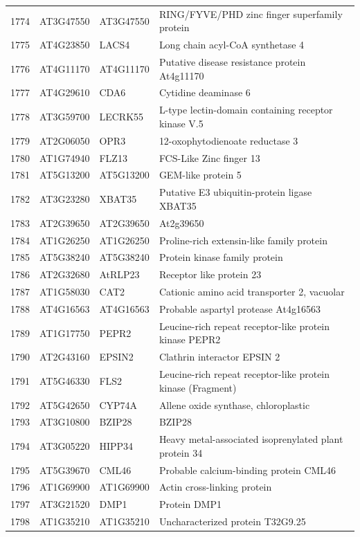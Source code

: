 \documentclass[11pt]{article}
\begin{document}
\begin{center}
\begin{tabular}{rlll}
1774 & AT3G47550 & AT3G47550 & RING/FYVE/PHD zinc finger superfamily protein\\
1775 & AT4G23850 & LACS4 & Long chain acyl-CoA synthetase 4\\
1776 & AT4G11170 & AT4G11170 & Putative disease resistance protein At4g11170\\
1777 & AT4G29610 & CDA6 & Cytidine deaminase 6\\
1778 & AT3G59700 & LECRK55 & L-type lectin-domain containing receptor kinase V.5\\
1779 & AT2G06050 & OPR3 & 12-oxophytodienoate reductase 3\\
1780 & AT1G74940 & FLZ13 & FCS-Like Zinc finger 13\\
1781 & AT5G13200 & AT5G13200 & GEM-like protein 5\\
1782 & AT3G23280 & XBAT35 & Putative E3 ubiquitin-protein ligase XBAT35\\
1783 & AT2G39650 & AT2G39650 & At2g39650\\
1784 & AT1G26250 & AT1G26250 & Proline-rich extensin-like family protein\\
1785 & AT5G38240 & AT5G38240 & Protein kinase family protein\\
1786 & AT2G32680 & AtRLP23 & Receptor like protein 23\\
1787 & AT1G58030 & CAT2 & Cationic amino acid transporter 2, vacuolar\\
1788 & AT4G16563 & AT4G16563 & Probable aspartyl protease At4g16563\\
1789 & AT1G17750 & PEPR2 & Leucine-rich repeat receptor-like protein kinase PEPR2\\
1790 & AT2G43160 & EPSIN2 & Clathrin interactor EPSIN 2\\
1791 & AT5G46330 & FLS2 & Leucine-rich repeat receptor-like protein kinase (Fragment)\\
1792 & AT5G42650 & CYP74A & Allene oxide synthase, chloroplastic\\
1793 & AT3G10800 & BZIP28 & BZIP28\\
1794 & AT3G05220 & HIPP34 & Heavy metal-associated isoprenylated plant protein 34\\
1795 & AT5G39670 & CML46 & Probable calcium-binding protein CML46\\
1796 & AT1G69900 & AT1G69900 & Actin cross-linking protein\\
1797 & AT3G21520 & DMP1 & Protein DMP1\\
1798 & AT1G35210 & AT1G35210 & Uncharacterized protein T32G9.25\\

\end{tabular}
\end{center}
\end{document}
